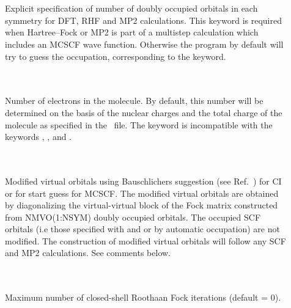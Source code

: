\begin{description}

\item[] \ \\
     \\
  Explicit specification of number of doubly occupied orbitals in each symmetry
  for DFT, RHF and MP2 calculations. This keyword
  is required when Hartree--Fock or MP2 is part of a multistep
  calculation which includes an MCSCF wave function. 
  Otherwise the program by default will try to guess the occupation,
  corresponding to the   keyword.

\item[] \ \\
   \\
  Number of electrons in the molecule.
  By default, this number will be determined on the basis of the nuclear
  charges and the total charge of the molecule
  as specified in the \molinp\ file.
  The keyword is incompatible with the keywords ,
  , and .

\item[] \ \\
   \\
  Modified virtual orbitals using Bauschlichers suggestion
  (see Ref.~\cite{cwbjcp72})
  for CI or for start guess for MCSCF. The modified virtual orbitals
  are obtained by  diagonalizing the virtual-virtual
  block of the Fock matrix constructed from NMVO(1:NSYM) doubly
  occupied orbitals.
  The occupied SCF orbitals (i.e those specified with
   and 
  or by automatic occupation) are not modified.
  The construction of modified virtual orbitals
  will follow any SCF and MP2 calculations.
  See comments below.

\item[] \ \\
   \\
  Maximum number of closed-shell Roothaan
  Fock iterations (default = 0).


\end{description}
